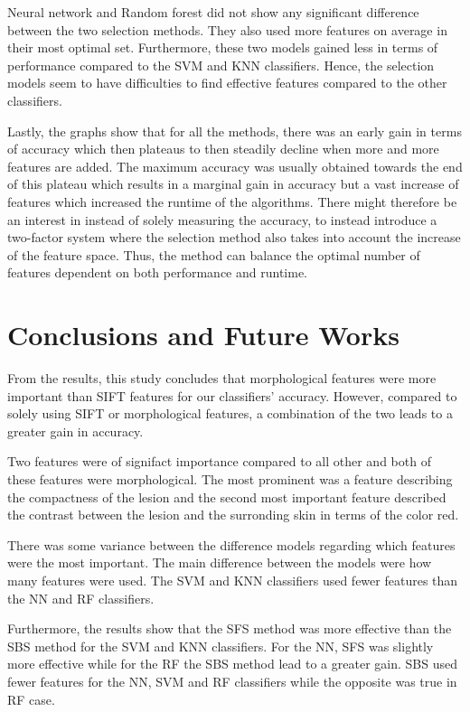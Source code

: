\documentclass{kththesis}
\begin{document}
Neural network and Random forest did not show any significant difference between the two selection methods. They also used more features on average in their most optimal set. Furthermore, these two models gained less in terms of performance compared to the SVM and KNN classifiers. Hence, the selection models seem to have difficulties to find effective features compared to the other classifiers.

Lastly, the graphs show that for all the methods, there was an early gain in terms of accuracy which then plateaus to then steadily decline when more and more features are added. The maximum accuracy was usually obtained towards the end of this plateau which results in a marginal gain in accuracy but a vast increase of features which increased the runtime of the algorithms. There might therefore be an interest in instead of solely measuring the accuracy, to instead introduce a two-factor system where the selection method also takes into account the increase of the feature space. Thus, the method can balance the optimal number of features dependent on both performance and runtime.


\chapter{Conclusions and Future Works}

From the results, this study concludes that morphological features were more important than SIFT features for our classifiers' accuracy. However, compared to solely using SIFT or morphological features, a combination of the two leads to a greater gain in accuracy.

Two features were of signifact importance compared to all other and both of these features were morphological. The most prominent was a feature describing the compactness of the lesion and the second most important feature described the contrast between the lesion and the surronding skin in terms of the color red.

There was some variance between the difference models regarding which features were the most important. The main difference between the models were how many features were used. The SVM and KNN classifiers used fewer features than the NN and RF classifiers. 

Furthermore, the results show that the SFS method was more effective than the SBS method for the SVM and KNN classifiers. For the NN, SFS was slightly more effective while for the RF the SBS method lead to a greater gain. SBS used fewer features for the NN, SVM and RF classifiers while the opposite was true in RF case.
\end{document}
